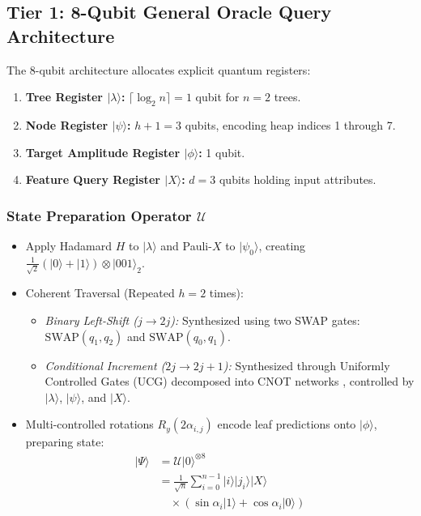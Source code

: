 \documentclass[conference]{IEEEtran}
\begin{document}
\subsection{Tier 1: 8-Qubit General Oracle Query Architecture}\label{subsec4.1}

The 8-qubit architecture allocates explicit quantum registers:
\begin{enumerate}
    \item \textbf{Tree Register $|\lambda\rangle$:} $\lceil \log_2 n \rceil = 1$ qubit for $n = 2$ trees.
    \item \textbf{Node Register $|\psi\rangle$:} $h + 1 = 3$ qubits, encoding heap indices 1 through 7.
    \item \textbf{Target Amplitude Register $|\phi\rangle$:} 1 qubit.
    \item \textbf{Feature Query Register $|X\rangle$:} $d = 3$ qubits holding input attributes.
\end{enumerate}

\subsubsection{State Preparation Operator $\mathcal{U}$}
\begin{itemize}
    \item Apply Hadamard $H$ to $|\lambda\rangle$ and Pauli-$X$ to $|\psi_0\rangle$, creating $\frac{1}{\sqrt{2}}(|0\rangle + |1\rangle) \otimes |001\rangle_2$.
    \item Coherent Traversal (Repeated $h = 2$ times):
    \begin{itemize}
        \item \emph{Binary Left-Shift ($j \to 2j$):} Synthesized using two SWAP gates: $\text{SWAP}(q_1, q_2)$ and $\text{SWAP}(q_0, q_1)$.
        \item \emph{Conditional Increment ($2j \to 2j + 1$):} Synthesized through Uniformly Controlled Gates (UCG) decomposed into CNOT networks \cite{shende2006synthesis}, controlled by $|\lambda\rangle$, $|\psi\rangle$, and $|X\rangle$.
    \end{itemize}
    \item Multi-controlled rotations $R_y(2\alpha_{i,j})$ encode leaf predictions onto $|\phi\rangle$, preparing state:
    \begin{equation}\label{eq9}
    \begin{aligned}
    |\Psi\rangle &= \mathcal{U}|0\rangle^{\otimes 8} \\
    &= \frac{1}{\sqrt{n}} \sum_{i=0}^{n-1} |i\rangle |j_i\rangle |X\rangle \\
    &\quad \times (\sin \alpha_i |1\rangle + \cos \alpha_i |0\rangle)
    \end{aligned}
    \end{equation}
\end{itemize}
\end{document}

